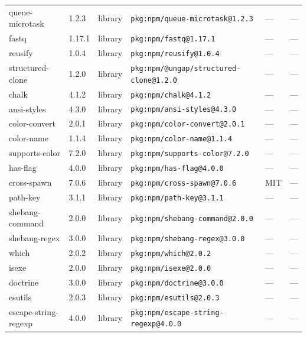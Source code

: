 \documentclass[11pt,a4paper]{article}
\begin{document}
\begin{longtable}{|p{4cm}|p{2cm}|p{1.6cm}|p{5cm}|p{1.5cm}|p{3.5cm}|}
\raggedright queue-microtask & 1.2.3 & library & \small\texttt{pkg:npm/queue-microtask@1.2.3} & — & \small — \\
\raggedright fastq & 1.17.1 & library & \small\texttt{pkg:npm/fastq@1.17.1} & — & \small — \\
\raggedright reusify & 1.0.4 & library & \small\texttt{pkg:npm/reusify@1.0.4} & — & \small — \\
\raggedright structured-clone & 1.2.0 & library & \small\texttt{pkg:npm/@ungap/structured-clone@1.2.0} & — & \small — \\
\raggedright chalk & 4.1.2 & library & \small\texttt{pkg:npm/chalk@4.1.2} & — & \small — \\
\raggedright ansi-styles & 4.3.0 & library & \small\texttt{pkg:npm/ansi-styles@4.3.0} & — & \small — \\
\raggedright color-convert & 2.0.1 & library & \small\texttt{pkg:npm/color-convert@2.0.1} & — & \small — \\
\raggedright color-name & 1.1.4 & library & \small\texttt{pkg:npm/color-name@1.1.4} & — & \small — \\
\raggedright supports-color & 7.2.0 & library & \small\texttt{pkg:npm/supports-color@7.2.0} & — & \small — \\
\raggedright has-flag & 4.0.0 & library & \small\texttt{pkg:npm/has-flag@4.0.0} & — & \small — \\
\raggedright cross-spawn & 7.0.6 & library & \small\texttt{pkg:npm/cross-spawn@7.0.6} & MIT & \small — \\
\raggedright path-key & 3.1.1 & library & \small\texttt{pkg:npm/path-key@3.1.1} & — & \small — \\
\raggedright shebang-command & 2.0.0 & library & \small\texttt{pkg:npm/shebang-command@2.0.0} & — & \small — \\
\raggedright shebang-regex & 3.0.0 & library & \small\texttt{pkg:npm/shebang-regex@3.0.0} & — & \small — \\
\raggedright which & 2.0.2 & library & \small\texttt{pkg:npm/which@2.0.2} & — & \small — \\
\raggedright isexe & 2.0.0 & library & \small\texttt{pkg:npm/isexe@2.0.0} & — & \small — \\
\raggedright doctrine & 3.0.0 & library & \small\texttt{pkg:npm/doctrine@3.0.0} & — & \small — \\
\raggedright esutils & 2.0.3 & library & \small\texttt{pkg:npm/esutils@2.0.3} & — & \small — \\
\raggedright escape-string-regexp & 4.0.0 & library & \small\texttt{pkg:npm/escape-string-regexp@4.0.0} & — & \small — \\

\end{longtable}
\end{document}
